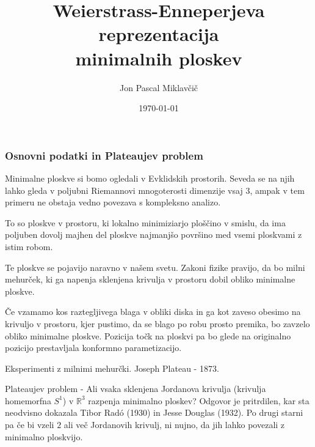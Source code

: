 \documentclass[8pt]{beamer}
\title[Weierstrass-Enneperjeva parametrizacija]{Weierstrass-Enneperjeva reprezentacija\\minimalnih ploskev}
\subtitle{}
\author[Jon Pascal Miklavčič]{Jon Pascal Miklavčič}
\institute[]{Mentor: doc.~dr.~Uroš Kuzman}
\date{\tiny \today}
\theoremstyle{definition}
\theoremstyle{remark}
\theoremstyle{plain}
\numberwithin{equation}{section}  %
\begin{document}
\frame{\titlepage}

\begin{frame}
    \frametitle{Osnovni podatki in Plateaujev problem}

    Minimalne ploskve si bomo ogledali v Evklidskih prostorih. Seveda se na njih lahko gleda v poljubni Riemannovi mnogoterosti dimenzije vsaj $3$, ampak v tem primeru ne obstaja vedno povezava s kompleksno analizo. 

    \vspace{0.8em}

    To so ploskve v prostoru, ki \textcolor{red1}{lokalno minimiziarjo ploščino} v smislu, da ima poljuben dovolj majhen del ploskve najmanjšo površino med vsemi ploskvami z istim robom.

    \vspace{0.8em}

    Te ploskve se pojavijo naravno v našem svetu. Zakoni fizike pravijo, da bo milni mehurček, ki ga napenja sklenjena krivulja v prostoru dobil obliko minimalne ploskve. 

    \vspace{0.8em}
    
    Če vzamamo kos raztegljivega blaga v obliki diska in ga kot zaveso obesimo na krivuljo v prostoru, kjer pustimo, da se blago po robu prosto premika, bo zavzelo obliko minimalne ploskve. Pozicija točk na ploskvi pa bo glede na originalno pozicijo prestavljala \textcolor{red1}{konformno parametizacijo}.

    \vspace{0.8em}

    Eksperimenti z milnimi mehurčki. \textcolor{red1}{Joseph Plateau} - 1873. 

    \vspace{0.8em}

    \textcolor{red1}{Plateaujev problem} - Ali vsaka sklenjena Jordanova krivulja (krivulja homemorfna $S^1$) v $\mathbb{R}^3$ razpenja minimalno ploskev? Odgovor je pritrdilen, kar sta neodvisno dokazala Tibor Radó (1930) in Jesse Douglas (1932). Po drugi starni pa če bi vzeli $2$ ali več Jordanovih krivulj, ni nujno, da jih lahko povezali z minimalno ploskvijo. 
    
\end{frame}
\end{document}
